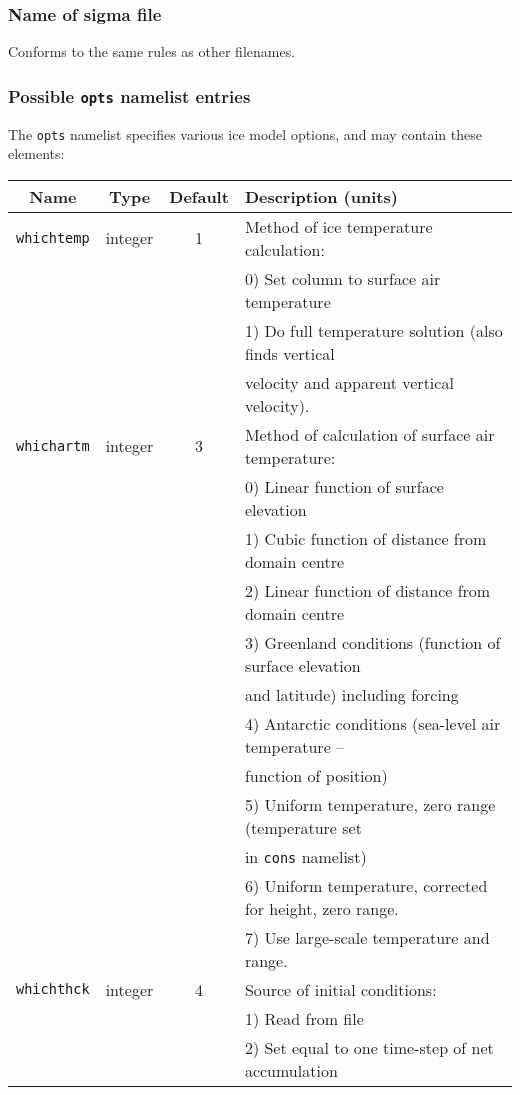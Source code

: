 \documentclass[11pt]{article}
\begin{document}
\subsubsection{Name of sigma file}
%
Conforms to the same rules as other filenames.
%
\subsubsection{Possible \texttt{opts} namelist entries}
%
The \texttt{opts} namelist specifies various ice model options, and may
contain these elements:
%
\begin{center}
\begin{tabular}{|c|c|c|l|}
\hline
Name & Type & Default & Description (units)\\
\hline
\hline
\texttt{whichtemp} & integer & 1 & Method of ice temperature calculation: \\
 & & & 0) Set column to surface air temperature \\
 & & & 1) Do full temperature solution (also finds vertical \\
 & & & velocity and apparent vertical velocity). \\
\hline
\texttt{whichartm} & integer & 3 & Method of calculation of surface air
temperature: \\
 & & & 0) Linear function of surface elevation \\
 & & & 1) Cubic function of distance from domain centre \\
 & & & 2) Linear function of distance from domain centre \\
 & & & 3) Greenland conditions (function of surface elevation \\
 & & & and latitude) including forcing \\
 & & & 4) Antarctic conditions (sea-level air temperature -- \\
 & & & function of position) \\
 & & & 5) Uniform temperature, zero range (temperature set \\
 & & & in \texttt{cons} namelist) \\
 & & & 6) Uniform temperature, corrected for height, zero range. \\
 & & & 7) Use large-scale temperature and range. \\
\hline
\texttt{whichthck} & integer & 4 & Source of initial conditions: \\
 & & & 1) Read from file \\
 & & & 2) Set equal to one time-step of net accumulation \\

\end{tabular}
\end{center}
\end{document}
